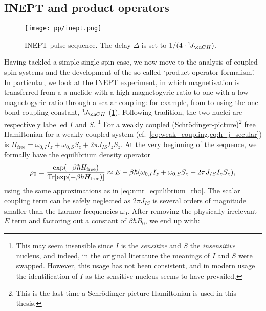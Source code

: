 \subsection{INEPT and product operators}
\label{subsec:theory__inept}

\begin{figure}[ht]
    \centering
    \texttt{[image: pp/inept.png]}
    \caption[INEPT pulse sequence]{
        INEPT pulse sequence.
        The delay $\Delta$ is set to $1/(4 \cdot \oneJ{CH})$.
    }
    \label{fig:inept}
\end{figure}

Having tackled a simple single-spin case, we now move to the analysis of coupled spin systems and the development of the so-called `product operator formalism'.\autocite{Sorensen1984PNMRS}
In particular, we look at the INEPT experiment\autocite{Morris1979JACS,Morris1980JACS}, in which magnetisation is transferred from a a nuclide with a high magnetogyric ratio to one with a low magnetogyric ratio through a scalar coupling: for example, from \proton{} to \carbon{} using the one-bond coupling constant, $\oneJ{CH}$ (\cref{fig:inept}).
Following tradition, the two nuclei are respectively labelled $I$ and $S$.%
\footnote{This may seem insensible since $I$ is the \textit{sensitive} and $S$ the \textit{insensitive} nucleus, and indeed, in the original literature\autocite{Morris1979JACS} the meanings of $I$ and $S$ were swapped. However, this usage has not been consistent\autocite{Pines1972JCP}, and in modern usage the identification of $I$ as the sensitive nucleus seems to have prevailed.}
For a weakly coupled (Schr\"odinger-picture)\footnote{This is the last time a Schr\"odinger-picture Hamiltonian is used in this thesis.} free Hamiltonian for a weakly coupled system (cf.\ \cref{eq:weak_coupling,eq:h_j_secular}) is $H_\text{free} = \omega_{0,I} I_z + \omega_{0,S} S_z + 2\pi J_{IS} I_z S_z$.
At the very beginning of the sequence, we formally have the equilibrium density operator
\begin{equation}
    \label{eq:density_eqm_heteronuclear_full}
    \rho_0 = \frac{\exp(-\beta\hbar H_\text{free})}{\operatorname{Tr}[\exp(-\beta\hbar H_\text{free})]}
    \approx E - \beta\hbar (\omega_{0,I} I_z + \omega_{0,S} S_z + 2\pi J_{IS} I_z S_z),
\end{equation}
using the same approximations as in \cref{eq:nmr_equilibrium_rho}.
The scalar coupling term can be safely neglected as $2\pi J_{IS}$ is several orders of magnitude smaller than the Larmor frequencies $\omega_0$.
After removing the physically irrelevant $E$ term and factoring out a constant of $\beta\hbar B_0$, we end up with:
